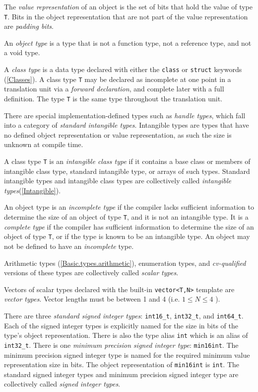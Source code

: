 \p The \textit{value representation} of an object is the set of bits that hold
the value of type \texttt{T}. Bits in the object representation that are not
part of the value representation are \textit{padding bits}.

\p An \textit{object type} is a type that is not a function type, not a
reference type, and not a void type.

\p A \textit{class type} is a data type declared with either the \texttt{class}
or \texttt{struct} keywords (\ref{Classes}). A class type \texttt{T} may be
declared as incomplete at one point in a translation unit via a \textit{forward
declaration}, and complete later with a full definition. The type \texttt{T} is
the same type throughout the translation unit.

\p There are special implementation-defined types such as \textit{handle types},
which fall into a category of \textit{standard intangible types}. Intangible
types are types that have no defined object representation or value
representation, as such the size is unknown at compile time.

\p A class type \texttt{T} is an \textit{intangible class type} if it contains
a base class or members of intangible class type, standard intangible type,
or arrays of such types. Standard intangible types and intangible class types
are collectively called \textit{intangible types}(\ref{Intangible}).

\p An object type is an \textit{incomplete type} if the compiler lacks
sufficient information to determine the size of an object of type \texttt{T},
and it is not an intangible type. It is a \textit{complete type} if the compiler
has sufficient information to determine the size of an object of type
\texttt{T}, or if the type is known to be an intangible type. An object may not
be defined to have an \textit{incomplete} type.

\p Arithmetic types (\ref{Basic.types.arithmetic}), enumeration types, and
\textit{cv-qualified} versions of these types are collectively called
\textit{scalar types}.

\p Vectors of scalar types declared with the built-in \texttt{vector<T,N>}
template are \textit{vector types}. Vector lengths must be between 1 and 4 (i.e.
\( 1 \leq N \leq 4 \) ).


\p There are three \textit{standard signed integer types}: \texttt{int16\_t},
\texttt{int32\_t}, and \texttt{int64\_t}. Each of the signed integer types is
explicitly named for the size in bits of the type's object representation. There
is also the type alias \texttt{int} which is an alias of \texttt{int32\_t}.
There is one \textit{minimum precision signed integer type}: \texttt{min16int}.
The minimum precision signed integer type is named for the required minimum
value representation size in bits. The object representation of
\texttt{min16int} is \texttt{int}. The standard signed integer types and minimum
precision signed integer type are collectively called \textit{signed integer
types}.

